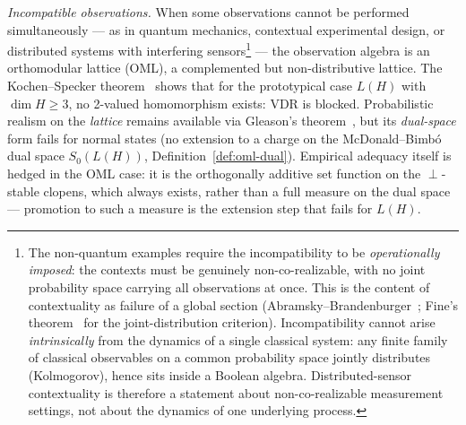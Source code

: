 \smallskip
\noindent\emph{Incompatible observations.}
When some observations cannot be performed simultaneously --- as in
quantum mechanics, contextual experimental design, or distributed
systems with interfering sensors\footnote{The non-quantum examples
require the incompatibility to be \emph{operationally imposed}: the
contexts must be genuinely non-co-realizable, with no joint
probability space carrying all observations at once. This is the
content of contextuality as failure of a global section
(Abramsky--Brandenburger~\cite{AbramskyBrandenburger2011}; Fine's
theorem~\cite{Fine1982} for the joint-distribution criterion).
Incompatibility cannot arise \emph{intrinsically} from the dynamics
of a single classical system: any finite family of classical
observables on a common probability space jointly distributes
(Kolmogorov), hence sits inside a Boolean algebra. Distributed-sensor
contextuality is therefore a statement about non-co-realizable
measurement settings, not about the dynamics of one underlying
process.} --- the observation algebra is an
orthomodular lattice (OML), a complemented but non-distributive
lattice.  The Kochen--Specker theorem~\cite{KochenSpecker1967}
shows that for the prototypical case $L(H)$ with $\dim H \geq 3$,
no 2-valued homomorphism exists: VDR is blocked.  Probabilistic
realism on the \emph{lattice} remains available via Gleason's
theorem~\cite{Gleason1957}, but its \emph{dual-space} form fails for
normal states (no extension to a charge on the McDonald--Bimb\'{o} dual
space $S_0(L(H))$, Definition~\ref{def:oml-dual}).  Empirical adequacy
itself is hedged in the OML case: it is the orthogonally additive set
function on the $\perp$-stable clopens, which always exists, rather
than a full measure on the dual space --- promotion to such a measure
is the extension step that fails for $L(H)$.

